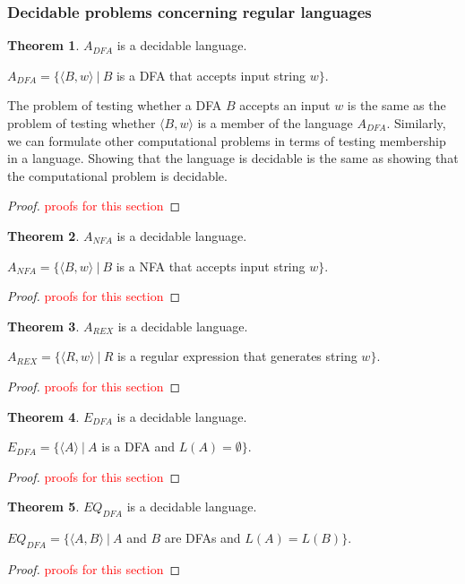 \documentclass[11pt]{article}
\theoremstyle{definition}
\newtheorem{thm}{Theorem}[section]
\newcommand{\todo}{\textcolor{red}}
\begin{document}
\subsubsection{Decidable problems concerning regular languages}
\begin{thm}
    $A_{DFA}$ is a decidable language.
    \begin{center}
        $A_{DFA} = \{\langle B,w\rangle\ |\ B$ is a DFA that accepts input string $w\}$.
    \end{center}
    The problem of testing whether a DFA $B$ accepts an input $w$ is the same as the problem of testing whether $\langle B, w\rangle$ is a member of the language $A_{DFA}$. Similarly, we can formulate other computational problems in terms of testing membership in a language. Showing that the language is decidable is the same as showing that the computational problem is decidable.
\end{thm}
\begin{proof}
    \todo{proofs for this section}
\end{proof}
\begin{thm}
    $A_{NFA}$ is a decidable language.
    \begin{center}
        $A_{NFA} = \{\langle B,w\rangle\ |\ B$ is a NFA that accepts input string $w\}$.
    \end{center}
\end{thm}
\begin{proof}
    \todo{proofs for this section}
\end{proof}
\begin{thm}
    $A_{REX}$ is a decidable language.
    \begin{center}
        $A_{REX} = \{\langle R,w\rangle\ |\ R$ is a regular expression that generates string $w\}$.
    \end{center}
\end{thm}
\begin{proof}
    \todo{proofs for this section}
\end{proof}
\begin{thm}
    $E_{DFA}$ is a decidable language.
    \begin{center}
        $E_{DFA} = \{\langle A\rangle\ |\ A$ is a DFA and $L(A)=\emptyset\}$.
    \end{center}
\end{thm}
\begin{proof}
    \todo{proofs for this section}
\end{proof}
\begin{thm}
    $EQ_{DFA}$ is a decidable language.
    \begin{center}
        $EQ_{DFA} =\{\langle A, B\rangle\ |\ A$ and $B$ are DFAs and $L(A)=L(B)\}$.
    \end{center}
\end{thm}
\begin{proof}
    \todo{proofs for this section}
\end{proof}
\end{document}
